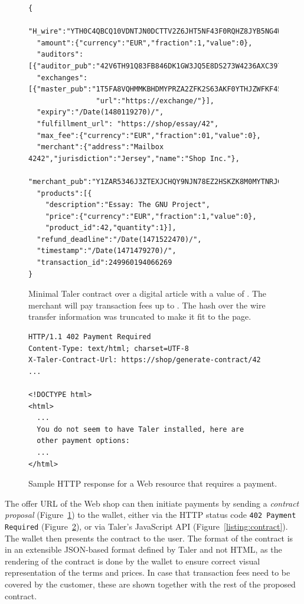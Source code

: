 \documentclass{llncs}
\begin{document}
\begin{figure}[t!]
  \lstset{language=JavaScript}
\begin{lstlisting}
{
  "H_wire":"YTH0C4QBCQ10VDNTJN0DCTTV2Z6JHT5NF43F0RQHZ8JYB5NG4W4G...",
  "amount":{"currency":"EUR","fraction":1,"value":0},
  "auditors":[{"auditor_pub":"42V6TH91Q83FB846DK1GW3JQ5E8DS273W4236AXC397892ESD0B0"}],
  "exchanges":[{"master_pub":"1T5FA8VQHMMKBHDMYPRZA2ZFK2S63AKF0YTHJZWFKF45K2JGC8H0",
                "url":"https://exchange/"}],
  "expiry":"/Date(1480119270)/",
  "fulfillment_url": "https://shop/essay/42",
  "max_fee":{"currency":"EUR","fraction":01,"value":0},
  "merchant":{"address":"Mailbox 4242","jurisdiction":"Jersey","name":"Shop Inc."},
  "merchant_pub":"Y1ZAR5346J3ZTEXJCHQY9NJN78EZ2HSKZK8M0MYTNRJG5N0HD520",
  "products":[{
    "description":"Essay: The GNU Project",
    "price":{"currency":"EUR","fraction":1,"value":0},
    "product_id":42,"quantity":1}],
  "refund_deadline":"/Date(1471522470)/",
  "timestamp":"/Date(1471479270)/",
  "transaction_id":249960194066269
}
\end{lstlisting}
  \caption{Minimal Taler contract over a digital article with a value of . The merchant will pay transaction fees up to .  The hash over the wire transfer information was truncated to make it fit to the page.}
  \label{listing:json-contract}
\end{figure}

\begin{figure}[t!]
\begin{lstlisting}
HTTP/1.1 402 Payment Required
Content-Type: text/html; charset=UTF-8
X-Taler-Contract-Url: https://shop/generate-contract/42
...

<!DOCTYPE html>
<html>
  ...
  You do not seem to have Taler installed, here are
  other payment options:
  ...
</html>
\end{lstlisting}
 \caption{Sample HTTP response for a Web resource that requires a payment.}
  \label{listing:http-contract}
\end{figure}

The offer URL of the Web shop can then initiate payments by sending a
\emph{contract proposal} (Figure~\ref{listing:json-contract}) to the wallet, either via the HTTP status
code {\tt 402 Payment Required} (Figure~\ref{listing:http-contract}), or via Taler's JavaScript API
(Figure~\ref{listing:contract}).  The wallet then presents the
contract to the user.  The format of the contract is in an extensible
JSON-based format defined by Taler and not HTML, as the rendering of
the contract is done by the wallet to ensure correct visual
representation of the terms and prices.  In case that transaction fees
need to be covered by the customer, these are shown together with the
rest of the proposed contract.
\end{document}

